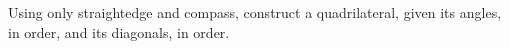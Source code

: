 Using only straightedge and compass,
construct a quadrilateral,
given its angles, in order,
and its diagonals, in order.
